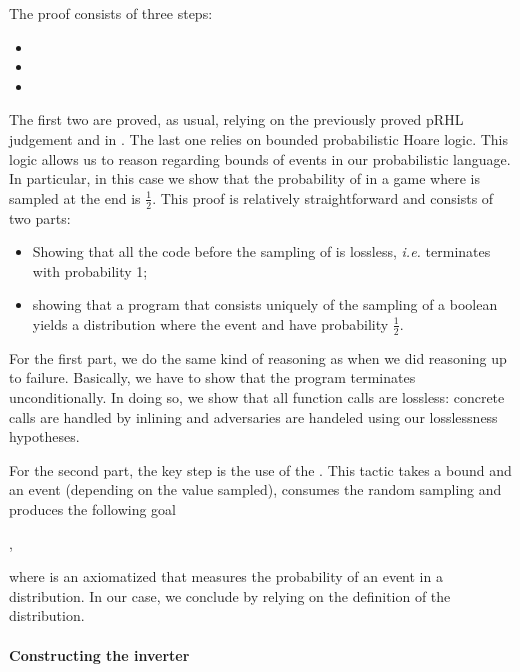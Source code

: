 The proof consists of three steps:
\begin{itemize}
\item {} 
\item {}
\item {}
\end{itemize}
The first two are proved, as usual, relying on the previously proved
pRHL judgement and in . The last one relies on bounded
probabilistic Hoare logic. This logic allows us to reason regarding
bounds of events in our probabilistic language. In particular, in this
case we show that the probability of  in a game where 
is sampled at the end is $\frac{1}{2}$. This proof is relatively
straightforward and consists of two parts:
\begin{itemize}
\item Showing that all the code before the sampling of  is
  lossless, {\em i.e.} terminates with probability 1;
\item showing that a program that consists uniquely of the sampling of
  a boolean  yields a distribution where the event 
  and  have probability $\frac{1}{2}$.
\end{itemize}

For the first part, we do the same kind of reasoning as when we did
reasoning up to failure. Basically, we have to show that the program
terminates unconditionally. In doing so, we show that all function
calls are lossless: concrete calls are handled by inlining and
adversaries are handeled using our losslessness hypotheses.

For the second part, the key step is the use of the . This tactic takes a bound and an event
(depending on the value sampled), consumes the random sampling and
produces the following goal


,

where  is an axiomatized that measures the probability of an
event in a distribution. In our case, we conclude by relying on the
definition of the  distribution.


\paragraph{Constructing the inverter}

